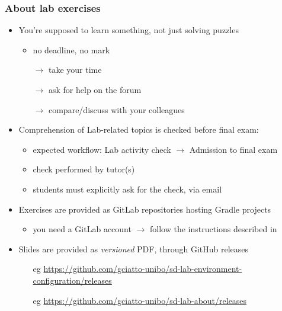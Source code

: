 \documentclass[handout]{beamer}\mode<presentation>{\usetheme{AMSCesenaPurpleAndGold}}
\begin{document}
\begin{frame}%
	\frametitle{About lab exercises}

	\begin{itemize}
		\item You're supposed to learn something, not just solving puzzles
		\begin{itemize}
			\item no deadline, no mark
			\item[$\rightarrow$] take your time
			\item[$\rightarrow$] ask for help on the forum
			\item[$\rightarrow$] compare/discuss with your colleagues
		\end{itemize}

		\vfill

		\item Comprehension of Lab-related topics is checked before final exam:
		\begin{itemize}
			\item \alert{expected workflow:} Lab activity check $\rightarrow$ Admission to final exam
			\item check performed by tutor(s)
			\item students must explicitly ask for the check, via email
		\end{itemize}

		\vfill

		\item Exercises are provided as GitLab repositories hosting Gradle projects
		\begin{itemize}
			\item you need a GitLab account $\rightarrow$ follow the instructions described in 
		\end{itemize}

        \vfill

        \item Slides are provided as \emph{versioned} PDF, through GitHub releases
        \begin{itemize}
            \item[eg] \url{https://github.com/gciatto-unibo/sd-lab-environment-configuration/releases}
            \item[eg] \url{https://github.com/gciatto-unibo/sd-lab-about/releases}
        \end{itemize}

	\end{itemize}

\end{frame}
\end{document}
